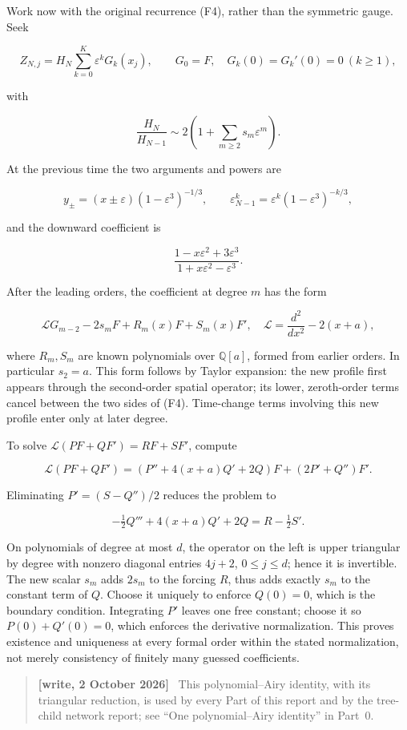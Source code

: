 \documentclass[11pt,letterpaper]{article}
\numberwithin{equation}{section}
\theoremstyle{remark}
\newenvironment{writenote}{\par\smallskip\begin{quote}\small\textbf{[write, 2 October 2026]}\ }{\end{quote}\smallskip}
\begin{document}
Work now with the original recurrence (F4), rather than the symmetric gauge. Seek

\[
Z_{N,j}=H_N\sum_{k=0}^K\varepsilon^kG_k(x_j),\qquad
G_0=F,\quad G_k(0)=G_k'(0)=0\ (k\ge1),
\]

with

\[
\frac{H_N}{H_{N-1}}
\sim2\left(1+\sum_{m\ge2}s_m\varepsilon^m\right).
\tag{F26}
\]

At the previous time the two arguments and powers are

\[
y_\pm=(x\pm\varepsilon)(1-\varepsilon^3)^{-1/3},
\qquad
\varepsilon_{N-1}^k=\varepsilon^k(1-\varepsilon^3)^{-k/3},
\]

and the downward coefficient is

\[
\frac{1-x\varepsilon^2+3\varepsilon^3}
{1+x\varepsilon^2-\varepsilon^3}.
\]

After the leading orders, the coefficient at degree \(m\) has the form

\[
\mathcal LG_{m-2}-2s_mF+R_m(x)F+S_m(x)F',
\quad
\mathcal L=\frac{d^2}{dx^2}-2(x+a),
\tag{F27}
\]

where \(R_m,S_m\) are known polynomials over \(\mathbb Q[a]\), formed from earlier orders. In particular \(s_2=a\). This form follows by Taylor expansion: the new profile first appears through the second-order spatial operator; its lower, zeroth-order terms cancel between the two sides of (F4). Time-change terms involving this new profile enter only at later degree.

To solve \(\mathcal L(PF+QF')=RF+SF'\), compute

\[
\mathcal L(PF+QF')
=(P''+4(x+a)Q'+2Q)F+(2P'+Q'')F'.
\]

Eliminating \(P'=(S-Q'')/2\) reduces the problem to

\[
-\tfrac12 Q'''+4(x+a)Q'+2Q=R-\tfrac12S'.
\tag{F28}
\]

On polynomials of degree at most \(d\), the operator on the left is upper triangular by degree with nonzero diagonal entries \(4j+2\), \(0\le j\le d\); hence it is invertible. The new scalar \(s_m\) adds \(2s_m\) to the forcing \(R\), thus adds exactly \(s_m\) to the constant term of \(Q\). Choose it uniquely to enforce \(Q(0)=0\), which is the boundary condition. Integrating \(P'\) leaves one free constant; choose it so \(P(0)+Q'(0)=0\), which enforces the derivative normalization. This proves existence and uniqueness at every formal order within the stated normalization, not merely consistency of finitely many guessed coefficients.
\begin{writenote}
This polynomial--Airy identity, with its triangular reduction, is used by every Part of this report and by the tree-child network report; see ``One polynomial--Airy identity'' in Part~0.
\end{writenote}
\end{document}
